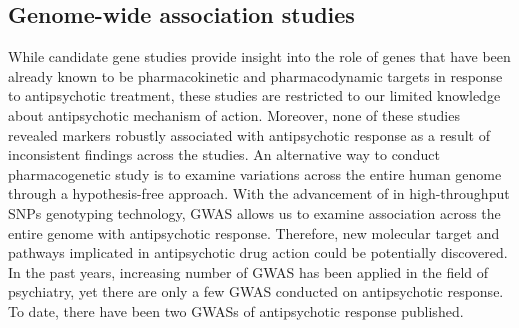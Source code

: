 \documentclass[12pt]{report}
\begin{document}
			\subsection{Genome-wide association studies} 
				While candidate gene studies provide insight into the role of genes that have been already known to be pharmacokinetic and pharmacodynamic targets in response to antipsychotic treatment, these studies are restricted to our limited knowledge about antipsychotic mechanism of action. 
				Moreover, none of these studies revealed markers robustly associated with antipsychotic response as a result of inconsistent findings across the studies. 
				An alternative way to conduct pharmacogenetic study is to examine variations across the entire human genome through a hypothesis-free approach. 
				With the advancement of in high-throughput SNPs genotyping technology, GWAS allows us to examine association across the entire genome with antipsychotic response. 
				Therefore, new molecular target and pathways implicated in antipsychotic drug action could be potentially discovered.  
				In the past years, increasing number of GWAS has been applied in the field of psychiatry, yet there are only a few GWAS conducted on antipsychotic response. 
				To date, there have been two GWASs of antipsychotic response published.  
				
\end{document}

